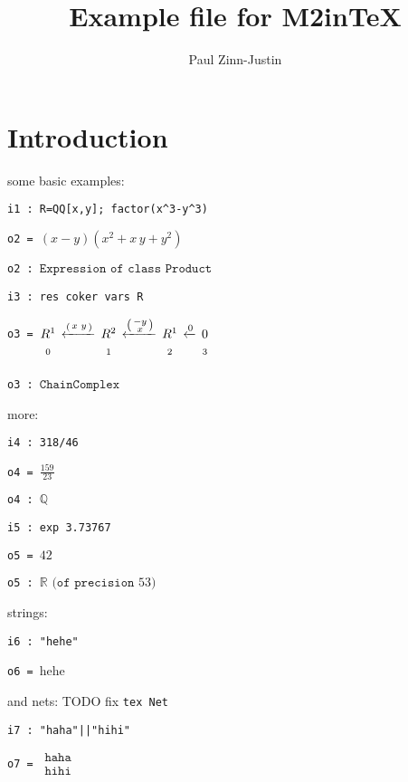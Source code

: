 \documentclass[12pt,a4paper]{amsart}
\title{Example file for M2inTeX}
\author{Paul Zinn-Justin}
\begin{document}
\maketitle

\section{Introduction}
some basic examples:
\begin{verbatim}
i1 : R=QQ[x,y]; factor(x^3-y^3)
\end{verbatim}
\noindent\verb|o2 = |$\left(x-y\right)\left(x^{  2}+x\,y+y^{  2}\right)$

\noindent\verb|o2 : |$\texttt{Expression}\texttt{ of class }\texttt{Product}$
\begin{verbatim}
i3 : res coker vars R
\end{verbatim}
\noindent\verb|o3 = |$\underset{\vphantom{\Big|}0}{R^{  1}}\,\xleftarrow{\left(\begin{smallmatrix}
x&y\\
\end{smallmatrix}\right)}\,\underset{\vphantom{\Big|}1}{R^{  2}}\,\xleftarrow{\left(\begin{smallmatrix}
-y\\
x\\
\end{smallmatrix}\right)}\,\underset{\vphantom{\Big|}2}{R^{  1}}\,\xleftarrow{0}\,\underset{\vphantom{\Big|}3}{0}$

\noindent\verb|o3 : |$\texttt{ChainComplex}$

more:
\begin{verbatim}
i4 : 318/46
\end{verbatim}
\noindent\verb|o4 = |$\frac{159}{ 23}$

\noindent\verb|o4 : |${\mathbb Q}$
\begin{verbatim}
i5 : exp 3.73767
\end{verbatim}
\noindent\verb|o5 = |${42}$

\noindent\verb|o5 : |${\mathbb R}\texttt{ (of precision } 53\texttt{)}$

strings:
\begin{verbatim}
i6 : "hehe"
\end{verbatim}
\noindent\verb|o6 = |hehe

and nets: TODO fix {\tt tex Net}
\begin{verbatim}
i7 : "haha"||"hihi"
\end{verbatim}
\noindent\verb|o7 = |$\begin{array}{l}\texttt{haha}\\
\texttt{hihi}\end{array}$
\end{document}
